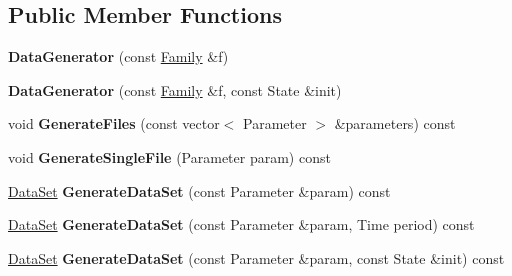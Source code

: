 \subsection*{Public Member Functions}
\begin{DoxyCompactItemize}
\item 
\hypertarget{struct_d_r_d_s_p_1_1_data_generator_a4a4cf90cd34a5a39391e300297066983}{{\bfseries Data\-Generator} (const \hyperlink{struct_d_r_d_s_p_1_1_family}{Family} \&f)}\label{struct_d_r_d_s_p_1_1_data_generator_a4a4cf90cd34a5a39391e300297066983}

\item 
\hypertarget{struct_d_r_d_s_p_1_1_data_generator_a5a941cc6ff7879e3575044db26ef9fd1}{{\bfseries Data\-Generator} (const \hyperlink{struct_d_r_d_s_p_1_1_family}{Family} \&f, const State \&init)}\label{struct_d_r_d_s_p_1_1_data_generator_a5a941cc6ff7879e3575044db26ef9fd1}

\item 
\hypertarget{struct_d_r_d_s_p_1_1_data_generator_af375f81e326785a741c508552eb8f247}{void {\bfseries Generate\-Files} (const vector$<$ Parameter $>$ \&parameters) const }\label{struct_d_r_d_s_p_1_1_data_generator_af375f81e326785a741c508552eb8f247}

\item 
\hypertarget{struct_d_r_d_s_p_1_1_data_generator_af2ed6178fcdd9e170695c81861dd5e60}{void {\bfseries Generate\-Single\-File} (Parameter param) const }\label{struct_d_r_d_s_p_1_1_data_generator_af2ed6178fcdd9e170695c81861dd5e60}

\item 
\hypertarget{struct_d_r_d_s_p_1_1_data_generator_a2527e7273aaf2d4752ddd8a0272d7cd5}{\hyperlink{struct_d_r_d_s_p_1_1_data_set}{Data\-Set} {\bfseries Generate\-Data\-Set} (const Parameter \&param) const }\label{struct_d_r_d_s_p_1_1_data_generator_a2527e7273aaf2d4752ddd8a0272d7cd5}

\item 
\hypertarget{struct_d_r_d_s_p_1_1_data_generator_ab8e0ad4602c07ebfe6d4081ea0a60e01}{\hyperlink{struct_d_r_d_s_p_1_1_data_set}{Data\-Set} {\bfseries Generate\-Data\-Set} (const Parameter \&param, Time period) const }\label{struct_d_r_d_s_p_1_1_data_generator_ab8e0ad4602c07ebfe6d4081ea0a60e01}

\item 
\hypertarget{struct_d_r_d_s_p_1_1_data_generator_a065083b18b9e8256873b3db6ac4af502}{\hyperlink{struct_d_r_d_s_p_1_1_data_set}{Data\-Set} {\bfseries Generate\-Data\-Set} (const Parameter \&param, const State \&init) const }\label{struct_d_r_d_s_p_1_1_data_generator_a065083b18b9e8256873b3db6ac4af502}


\end{DoxyCompactItemize}
